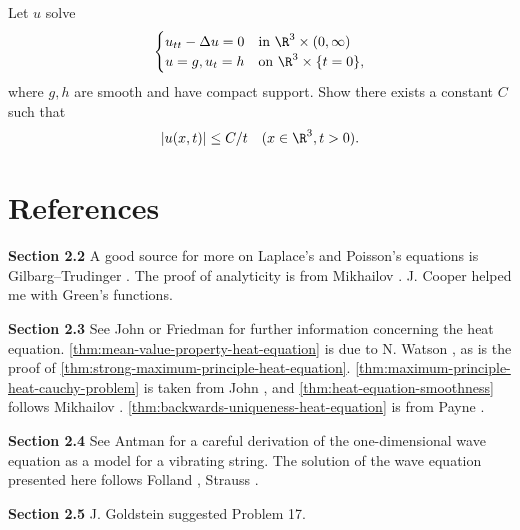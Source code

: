 \begin{exercise}
Let $u$ solve
$$
\begin{cases}
u_{tt} - \Delta u = 0 & \text{in } \R^3 \times (0,\infty) \\
u = g, u_t = h & \text{on } \R^3 \times \{t = 0\},
\end{cases}
$$
where $g, h$ are smooth and have compact support. Show there exists a constant $C$ such that
$$
|u(x,t)| \leq C/t \quad (x \in \R^3, t > 0).
$$
\end{exercise}

\section{References}
\label{sec:chapter2-references}

\textbf{Section 2.2} \quad A good source for more on Laplace's and Poisson's equations is Gilbarg--Trudinger \cite{GilbargTrudinger1983}. The proof of analyticity is from Mikhailov \cite{Mikhailov1978}. J. Cooper helped me with Green's functions.

\textbf{Section 2.3} \quad See John \cite{John1982} or Friedman \cite{Friedman1964} for further information concerning the heat equation. \cref{thm:mean-value-property-heat-equation} is due to N. Watson \cite{Watson1973}, as is the proof of \cref{thm:strong-maximum-principle-heat-equation}. \cref{thm:maximum-principle-heat-cauchy-problem} is taken from John \cite{John1982}, and \cref{thm:heat-equation-smoothness} follows Mikhailov \cite{Mikhailov1978}. \cref{thm:backwards-uniqueness-heat-equation} is from Payne \cite{Payne1975}.

\textbf{Section 2.4} \quad See Antman \cite{Antman1980} for a careful derivation of the one-dimensional wave equation as a model for a vibrating string. The solution of the wave equation presented here follows Folland \cite{Folland1976}, Strauss \cite{Strauss1992}.

\textbf{Section 2.5} \quad J. Goldstein suggested Problem 17.
